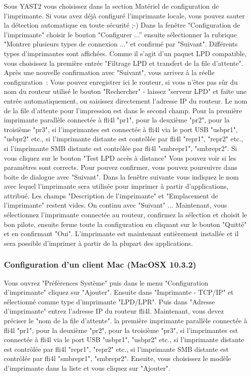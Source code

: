 Sous YAST2 vous choisissez dans la section Matériel de configuration de
l'imprimante. Si vous avez déjà configuré l'imprimante locale, vous pouvez
sauter la détection automatique en toute sécurité ;-)
Dans la fenêtre "Configuration de l'imprimante" choisir le bouton "Configurer ...''
ensuite sélectionner la rubrique  "Montrer plusieurs types de connexion ..." et
confirmé par "Suivant". Différents types d'imprimantes sont affichées. Comme il
s'agit d'un paquet LPD compatible, vous choisissez la première entrée "Filtrage
LPD et transfert de la file d'attente". Après une nouvelle confirmation avec
"Suivant", vous arrivez à la réelle configuration~:
Vous pouvez enregistrer ici le routeur, si vous n'êtes pas sûr du nom du routeur
utilisé le bouton "Rechercher" - laissez "serveur LPD" et faite une entrée
automatiquement, ou saisissez directement l'adresse IP du routeur.
Le nom de la file d'attente pour l'impression est dans le second champ. Pour
la première imprimante parallèle connectée à fli4l "pr1", pour la deuxième "pr2",
pour la troisième "pr3", si l'imprimantes est connectée à fli4l via le port USB
"usbpr1", "usbpr2" etc., si l'imprimante distante est contrôlée par fli4l "repr1",
 "repr2" etc., si l'imprimante SMB distante est contrôlée par fli4l "smbrepr1",
"smbrepr2". Si vous cliquez sur le bouton "Test LPD accès à distance" Vous pouvez
voir si les paramètres sont corrects. Pour pouvez confirmer, vous pouvez poursuivre
dans boite de dialogue avec "Suivant". Dans la fenêtre suivante vous indiquez
le nom avec lequel l'imprimante sera utilisée pour imprimer à partir d'applications,
attribué. Les champs "Description de l'imprimante" et "Emplacement de l'imprimante"
restent vides. On continu avec "Suivant" ...
Maintenant, vous sélectionnez l'imprimante connectée au routeur, confirmez la
sélection et choisit le bon pilote, ensuite ferme toute la configuration en
cliquant sur le bouton "Quitté" et en confirmant "Oui".
L'imprimante est maintenant entièrement installée et il sera possible d'imprimer
à partir de la plupart des applications.


\subsubsection{Configuration d'un client Mac (MacOSX 10.3.2)}

    Vous ouvrez "Préférences Système" puis dans le menu "Configuration d'imprimante"
    cliquez sur "Ajouter". Ensuite dans "Imprimante - TCP/IP" et sélectionné comme
    type d'imprimante "LPD/LPR". Puis dans "Adresse d'imprimante" entrez l'adresse
    IP du routeur fli4l. Maintenant, vous devez préciser le "nom de la file d'attente".
    la première imprimante parallèle connectée à fli4l "pr1", pour la deuxième
    "pr2", pour la troisième "pr3", si l'imprimantes est connectée à fli4l via
    le port USB "usbpr1", "usbpr2" etc., si l'imprimante distante est contrôlée
    par fli4l "repr1", "repr2" etc., si l'imprimante SMB distante est contrôlée
    par fli4l "smbrepr1", "smbrepr2". Ensuite, vous choisissez le modèle
    d'imprimante dans la liste et vous cliquez sur "Ajouter".

